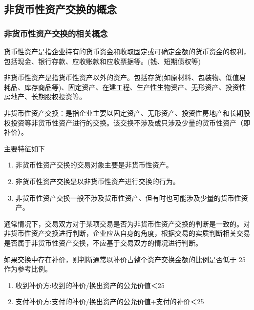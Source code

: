 \documentclass[UTF8,12pt]{ctexart}
\numberwithin{equation}{section} %
\numberwithin{figure}{section}
\numberwithin{table}{section}
\begin{document}
	\subsection{非货币性资产交换的概念}
	\subsubsection{非货币性资产交换的相关概念}
	货币性资产是指企业持有的货币资金和收取固定或可确定金额的货币资金的权利，包括现金、银行存款、应收账款和应收票据等。(钱、短期债权等)
	
	非货币性资产是指货币性资产以外的资产。包括存货(如原材料、包装物、低值易耗品、库存商品等)、固定资产、在建工程、生产性生物资产、无形资产、投资性房地产、长期股权投资等。
	
	非货币性资产交换：是指企业主要以固定资产、无形资产、投资性房地产和长期股权投资等非货币性资产进行的交换。该交换不涉及或只涉及少量的货币性资产（即补价）。
	
	主要特征如下
	\begin{enumerate}
		\item 非货币性资产交换的交易对象主要是非货币性资产。
		
		\item 非货币性资产交换是以非货币性资产进行交换的行为。
		
		\item 非货币性资产交换一般不涉及货币性资产、但有时也可能涉及少量的货币性资产。
		
	\end{enumerate}
	
	通常情况下，交易双方对于某项交易是否为非货币性资产交换的判断是一致的。对非货币性资产交换进行判断，企业应从自身的角度，根据交易的实质判断相关交易是否属于非货币性资产交换，不应基于交易双方的情况进行判断。
	
	如果交换中存在补价，则判断通常以补价占整个资产交换金额的比例是否低于 25作为参考比例。
	\begin{enumerate}
		\item 收到补价方:收到的补价/换出资产的公允价值＜25
		
		\item 支付补价方:支付的补价/换出资产的公允价值+支付的补价＜25
	\end{enumerate}
	
\end{document}
